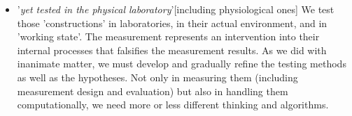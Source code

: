 {\begin{itemize}
\item '\textit{yet tested in the physical laboratory}'[including physiological ones] We test those 'constructions' in laboratories,
in their actual environment, and in 'working state'. The measurement
represents an intervention into their internal processes that falsifies
the measurement results. As we did with inanimate matter, we must develop and gradually refine the testing methods as well as the hypotheses.
Not only in measuring them  (including measurement design and evaluation) but also in handling them computationally, we need more or less different thinking and algorithms.
\end{itemize}
}

%


